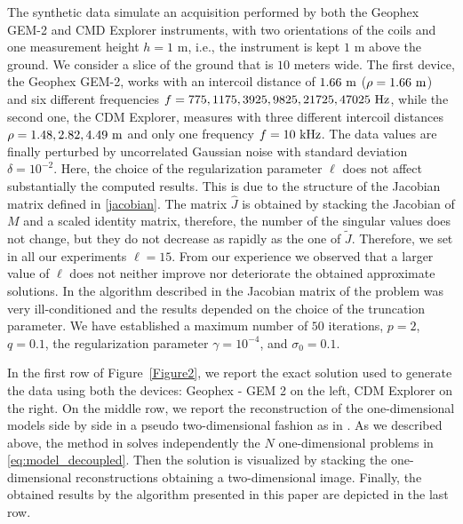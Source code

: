 \documentclass[final,leqno]{siamltex}
\begin{document}
The synthetic data simulate an acquisition performed by both the Geophex GEM-2 and CMD Explorer instruments, with two orientations of the coils and one measurement height $h = 1$ m, i.e., the instrument is kept $1$ m above the ground. We consider a slice of the ground that is $10$ meters wide. The first device, the Geophex GEM-2, works with an intercoil distance of $1.66~{\rm m}$ ($\rho = 1.66~{\rm m}$) and six different frequencies $f = 775, 1175, 3925, 9825, 21725, 47025~{\rm Hz}$, while the second one, the CDM Explorer, measures with three different intercoil distances $\rho = 1.48, 2.82, 4.49~{\rm m}$ and only one frequency $f = 10~{\rm kHz}$. 
The data values are finally perturbed by uncorrelated Gaussian noise with standard deviation $\delta = 10^{-2}$. Here, the choice of the regularization parameter $\ell$ does not affect substantially the computed results. This is due to the structure of the Jacobian matrix defined in \eqref{jacobian}. The matrix $\widehat{J}$ is obtained by stacking the Jacobian of ${M}$ and a scaled identity matrix, therefore, the number of the singular values does not change, but they do not decrease as rapidly as the one of $\widetilde{J}$. Therefore, we set in all our experiments $\ell=15$. From our experience we observed that a larger value of $\ell$ does not neither improve nor deteriorate the obtained approximate solutions. In the algorithm described in \cite{ddrv19} the Jacobian matrix of the problem was very ill-conditioned and the results depended on the choice of the truncation parameter. We have established a maximum number of $50$ iterations, $p=2$, $q=0.1$, the regularization parameter $\gamma = 10^{-4}$, and $\sigma_0=0.1$.

In the first row of Figure~\ref{Figure2}, we report the exact solution used to generate the data using both the devices: Geophex - GEM 2 on the left, CDM Explorer on the right. On the middle row, we report the reconstruction of the one-dimensional models side by side in a pseudo two-dimensional fashion as in \cite{ddrv19}. As we described above, the method in \cite{ddrv19} solves independently the $N$ one-dimensional problems in \eqref{eq:model_decoupled}. Then the solution is visualized by stacking the one-dimensional reconstructions obtaining a two-dimensional image. Finally, the obtained results by the algorithm presented in this paper are depicted in the last row. 
\end{document}
